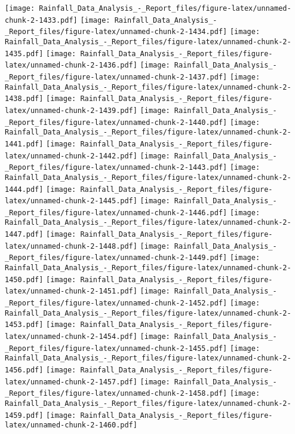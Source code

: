 \documentclass[
]{article}
\begin{document}
\texttt{[image: Rainfall\_Data\_Analysis\_-\_Report\_files/figure-latex/unnamed-chunk-2-1433.pdf]}
\texttt{[image: Rainfall\_Data\_Analysis\_-\_Report\_files/figure-latex/unnamed-chunk-2-1434.pdf]}
\texttt{[image: Rainfall\_Data\_Analysis\_-\_Report\_files/figure-latex/unnamed-chunk-2-1435.pdf]}
\texttt{[image: Rainfall\_Data\_Analysis\_-\_Report\_files/figure-latex/unnamed-chunk-2-1436.pdf]}
\texttt{[image: Rainfall\_Data\_Analysis\_-\_Report\_files/figure-latex/unnamed-chunk-2-1437.pdf]}
\texttt{[image: Rainfall\_Data\_Analysis\_-\_Report\_files/figure-latex/unnamed-chunk-2-1438.pdf]}
\texttt{[image: Rainfall\_Data\_Analysis\_-\_Report\_files/figure-latex/unnamed-chunk-2-1439.pdf]}
\texttt{[image: Rainfall\_Data\_Analysis\_-\_Report\_files/figure-latex/unnamed-chunk-2-1440.pdf]}
\texttt{[image: Rainfall\_Data\_Analysis\_-\_Report\_files/figure-latex/unnamed-chunk-2-1441.pdf]}
\texttt{[image: Rainfall\_Data\_Analysis\_-\_Report\_files/figure-latex/unnamed-chunk-2-1442.pdf]}
\texttt{[image: Rainfall\_Data\_Analysis\_-\_Report\_files/figure-latex/unnamed-chunk-2-1443.pdf]}
\texttt{[image: Rainfall\_Data\_Analysis\_-\_Report\_files/figure-latex/unnamed-chunk-2-1444.pdf]}
\texttt{[image: Rainfall\_Data\_Analysis\_-\_Report\_files/figure-latex/unnamed-chunk-2-1445.pdf]}
\texttt{[image: Rainfall\_Data\_Analysis\_-\_Report\_files/figure-latex/unnamed-chunk-2-1446.pdf]}
\texttt{[image: Rainfall\_Data\_Analysis\_-\_Report\_files/figure-latex/unnamed-chunk-2-1447.pdf]}
\texttt{[image: Rainfall\_Data\_Analysis\_-\_Report\_files/figure-latex/unnamed-chunk-2-1448.pdf]}
\texttt{[image: Rainfall\_Data\_Analysis\_-\_Report\_files/figure-latex/unnamed-chunk-2-1449.pdf]}
\texttt{[image: Rainfall\_Data\_Analysis\_-\_Report\_files/figure-latex/unnamed-chunk-2-1450.pdf]}
\texttt{[image: Rainfall\_Data\_Analysis\_-\_Report\_files/figure-latex/unnamed-chunk-2-1451.pdf]}
\texttt{[image: Rainfall\_Data\_Analysis\_-\_Report\_files/figure-latex/unnamed-chunk-2-1452.pdf]}
\texttt{[image: Rainfall\_Data\_Analysis\_-\_Report\_files/figure-latex/unnamed-chunk-2-1453.pdf]}
\texttt{[image: Rainfall\_Data\_Analysis\_-\_Report\_files/figure-latex/unnamed-chunk-2-1454.pdf]}
\texttt{[image: Rainfall\_Data\_Analysis\_-\_Report\_files/figure-latex/unnamed-chunk-2-1455.pdf]}
\texttt{[image: Rainfall\_Data\_Analysis\_-\_Report\_files/figure-latex/unnamed-chunk-2-1456.pdf]}
\texttt{[image: Rainfall\_Data\_Analysis\_-\_Report\_files/figure-latex/unnamed-chunk-2-1457.pdf]}
\texttt{[image: Rainfall\_Data\_Analysis\_-\_Report\_files/figure-latex/unnamed-chunk-2-1458.pdf]}
\texttt{[image: Rainfall\_Data\_Analysis\_-\_Report\_files/figure-latex/unnamed-chunk-2-1459.pdf]}
\texttt{[image: Rainfall\_Data\_Analysis\_-\_Report\_files/figure-latex/unnamed-chunk-2-1460.pdf]}
\end{document}
